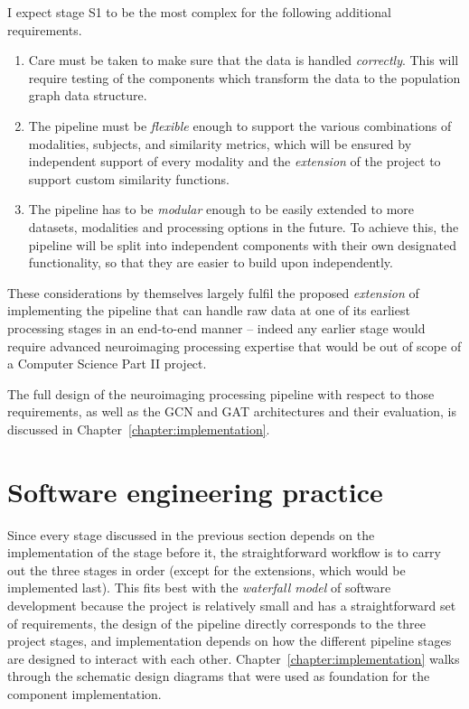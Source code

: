 I expect stage S1 to be the most complex for the following additional requirements.
\begin{enumerate}[label=R\arabic*.]
    \item Care must be taken to make sure that the data is handled \textit{correctly}. This will require testing of the components which transform the data to the population graph data structure.
    \item The pipeline must be \textit{flexible} enough to support the various combinations of modalities, subjects, and similarity metrics, which will be ensured by independent support of every modality and the \textit{extension} of the project to support custom similarity functions.
    \item The pipeline has to be \textit{modular} enough to be easily extended to more datasets, modalities and processing options in the future. To achieve this, the pipeline will be split into independent components with their own designated functionality, so that they are easier to build upon independently.
\end{enumerate} 

These considerations by themselves largely fulfil the proposed \textit{extension} of implementing the pipeline that can handle raw data at one of its earliest processing stages in an end-to-end manner – indeed any earlier stage would require advanced neuroimaging processing expertise that would be out of scope of a Computer Science Part II project. 

The full design of the neuroimaging processing pipeline with respect to those requirements, as well as the GCN and GAT architectures and their evaluation, is discussed in Chapter~\ref{chapter:implementation}.

\section{Software engineering practice}
Since every stage discussed in the previous section depends on the implementation of the stage before it, the straightforward workflow is to carry out the three stages in order (except for the extensions, which would be implemented last). This fits best with the \textit{waterfall model} of software development because the project is relatively small and has a straightforward set of requirements, the design of the pipeline directly corresponds to the three project stages, and implementation depends on how the different pipeline stages are designed to interact with each other. Chapter~\ref{chapter:implementation} walks through the schematic design diagrams that were used as foundation for the component implementation.

